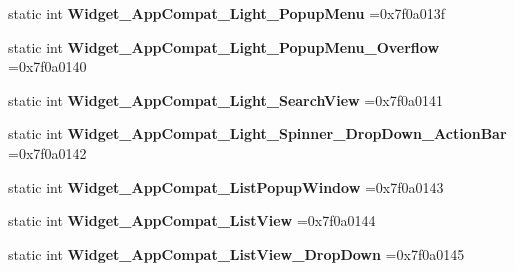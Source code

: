 \begin{DoxyCompactItemize}
\item 
\mbox{\label{classandroid_1_1support_1_1v7_1_1mediarouter_1_1R_1_1style_a5b0ad911b735a7a9bd46267e8608b8ea}} 
static int {\bfseries Widget\+\_\+\+App\+Compat\+\_\+\+Light\+\_\+\+Popup\+Menu} =0x7f0a013f
\item 
\mbox{\label{classandroid_1_1support_1_1v7_1_1mediarouter_1_1R_1_1style_a3d83cd79bd0ebc17425d222a49fe2287}} 
static int {\bfseries Widget\+\_\+\+App\+Compat\+\_\+\+Light\+\_\+\+Popup\+Menu\+\_\+\+Overflow} =0x7f0a0140
\item 
\mbox{\label{classandroid_1_1support_1_1v7_1_1mediarouter_1_1R_1_1style_a9d5e2c596c00b94480c213c459837e09}} 
static int {\bfseries Widget\+\_\+\+App\+Compat\+\_\+\+Light\+\_\+\+Search\+View} =0x7f0a0141
\item 
\mbox{\label{classandroid_1_1support_1_1v7_1_1mediarouter_1_1R_1_1style_ac045579e7c2a84b3b4a705afd9383380}} 
static int {\bfseries Widget\+\_\+\+App\+Compat\+\_\+\+Light\+\_\+\+Spinner\+\_\+\+Drop\+Down\+\_\+\+Action\+Bar} =0x7f0a0142
\item 
\mbox{\label{classandroid_1_1support_1_1v7_1_1mediarouter_1_1R_1_1style_a0535ecb3818064688237e4c263e4cc5c}} 
static int {\bfseries Widget\+\_\+\+App\+Compat\+\_\+\+List\+Popup\+Window} =0x7f0a0143
\item 
\mbox{\label{classandroid_1_1support_1_1v7_1_1mediarouter_1_1R_1_1style_a1b7df9c2cfb45361987db9a14b5bc1c8}} 
static int {\bfseries Widget\+\_\+\+App\+Compat\+\_\+\+List\+View} =0x7f0a0144
\item 
\mbox{\label{classandroid_1_1support_1_1v7_1_1mediarouter_1_1R_1_1style_ae688e1f791980e63bc6e13f94f6b4f05}} 
static int {\bfseries Widget\+\_\+\+App\+Compat\+\_\+\+List\+View\+\_\+\+Drop\+Down} =0x7f0a0145
\item 
\mbox{\label{classandroid_1_1support_1_1v7_1_1mediarouter_1_1R_1_1style_af1e74a20e9eac70963eb1a8dfc873775}} 

\end{DoxyCompactItemize}
